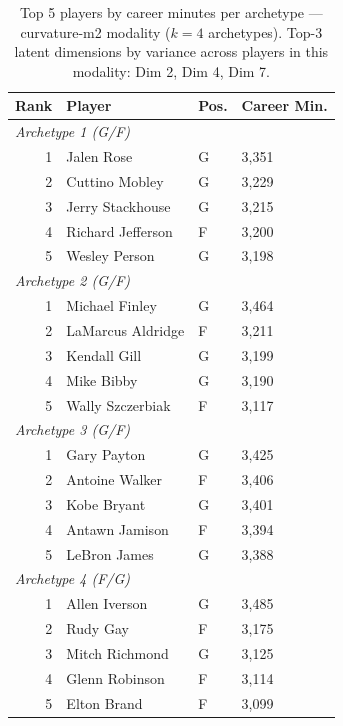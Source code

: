 \begin{table}[htbp]
  \centering\small
  \begin{tabular}{rlll}
    \toprule
    Rank & Player & Pos. & Career Min. \\
    \midrule
    \multicolumn{4}{l}{\textit{Archetype 1 (G/F)}} \\
    \midrule
    1 & Jalen Rose & G & 3,351 \\
    2 & Cuttino Mobley & G & 3,229 \\
    3 & Jerry Stackhouse & G & 3,215 \\
    4 & Richard Jefferson & F & 3,200 \\
    5 & Wesley Person & G & 3,198 \\
    \midrule[0.4pt]
    \multicolumn{4}{l}{\textit{Archetype 2 (G/F)}} \\
    \midrule
    1 & Michael Finley & G & 3,464 \\
    2 & LaMarcus Aldridge & F & 3,211 \\
    3 & Kendall Gill & G & 3,199 \\
    4 & Mike Bibby & G & 3,190 \\
    5 & Wally Szczerbiak & F & 3,117 \\
    \midrule[0.4pt]
    \multicolumn{4}{l}{\textit{Archetype 3 (G/F)}} \\
    \midrule
    1 & Gary Payton & G & 3,425 \\
    2 & Antoine Walker & F & 3,406 \\
    3 & Kobe Bryant & G & 3,401 \\
    4 & Antawn Jamison & F & 3,394 \\
    5 & LeBron James & G & 3,388 \\
    \midrule[0.4pt]
    \multicolumn{4}{l}{\textit{Archetype 4 (F/G)}} \\
    \midrule
    1 & Allen Iverson & G & 3,485 \\
    2 & Rudy Gay & F & 3,175 \\
    3 & Mitch Richmond & G & 3,125 \\
    4 & Glenn Robinson & F & 3,114 \\
    5 & Elton Brand & F & 3,099 \\
    \bottomrule
  \end{tabular}
  \caption{Top 5 players by career minutes per archetype --- curvature-m2 modality ($k=4$ archetypes). Top-3 latent dimensions by variance across players in this modality: Dim 2, Dim 4, Dim 7.}
  \label{tab:arch_reps_curvature_m2}
\end{table}

